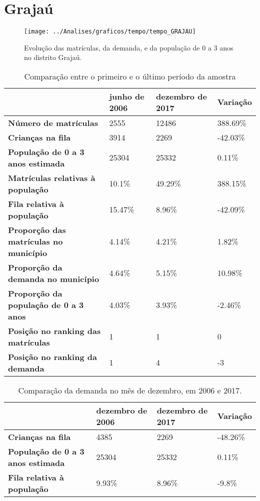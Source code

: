\section{Grajaú}
\begin{figure}[H]
\centering
\texttt{[image: ../Analises/graficos/tempo/tempo\_GRAJAU]}
\caption{Evolução das matrículas, da demanda, e da população de 0 a 3 anos no distrito Grajaú.}
\end{figure}
\begin{table}[H]
\begin{tabular}{|l|l|l|l|}
\hline
\textbf{}                                      & \textbf{junho de 2006}       & \textbf{dezembro de 2017}    & \textbf{Variação} \\ \hline
\textbf{Número de matrículas}                  & 2555 & 12486 & 388.69\% \\ \hline
\textbf{Crianças na fila}                      & 3914 & 2269 & -42.03\% \\ \hline
\textbf{População de 0 a 3 anos estimada}      & 25304 & 25332 & 0.11\% \\ \hline
\textbf{Matrículas relativas à população}      & 10.1\% & 49.29\% & 388.15\% \\ \hline
\textbf{Fila relativa à população}             & 15.47\% & 8.96\% & -42.09\% \\ \hline
\textbf{Proporção das matrículas no município} & 4.14\% & 4.21\% & 1.82\% \\ \hline
\textbf{Proporção da demanda no município}     & 4.64\% & 5.15\% & 10.98\% \\ \hline
\textbf{Proporção da população de 0 a 3 anos}  & 4.03\% & 3.93\% & -2.46\% \\ \hline
\textbf{Posição no ranking das matrículas}     & 1 & 1 & 0 \\ \hline
\textbf{Posição no ranking da demanda}         & 1 & 4 & -3 \\ \hline
\end{tabular}
\caption{Comparação entre o primeiro e o último período da amostra}
\end{table}
\begin{table}[H]
\begin{tabular}{|l|l|l|l|}
\hline
\textbf{}                                 & \textbf{dezembro de 2006} & \textbf{dezembro de 2017} & \textbf{Variação} \\ \hline
\textbf{Crianças na fila}                      & 4385 & 2269 & -48.26\% \\ \hline
\textbf{População de 0 a 3 anos estimada}      & 25304 & 25332 & 0.11\% \\ \hline
\textbf{Fila relativa à população}             & 9.93\% & 8.96\% & -9.8\% \\ \hline
\end{tabular}
\caption{Comparação da demanda no mês de dezembro, em 2006 e 2017.}
\end{table}
